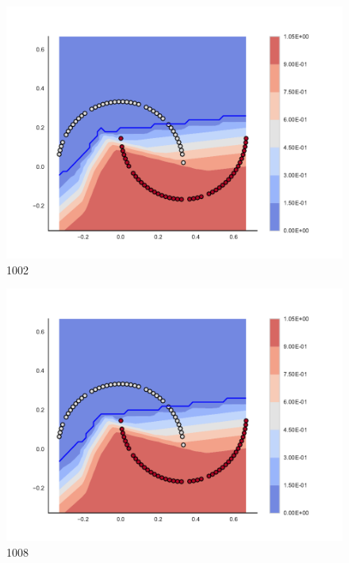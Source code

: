 \begin{subfigure}[b]{0.09\textwidth}
    \includegraphics[clip, trim=2.35cm 1.75cm 4.5cm 0cm,width=\textwidth]{img/convergence/1002.pdf}
    \caption{1002}
    \label{fig:convergence_1002}
\end{subfigure}
%
\begin{subfigure}[b]{0.09\textwidth}
    \includegraphics[clip, trim=2.35cm 1.75cm 4.5cm 0cm,width=\textwidth]{img/convergence/1008.pdf}
    \caption{1008}
    \label{fig:convergence_1008}
\end{subfigure}
%
